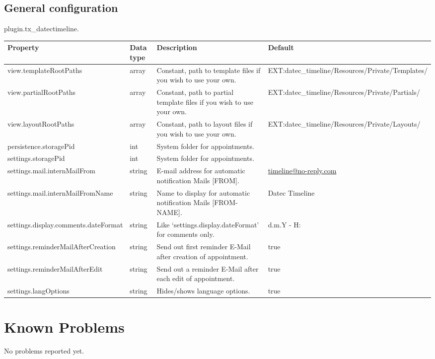\documentclass[a4paper,10pt,english]{sphinxmanual}
\begin{document}
\section{General configuration}
\label{Configuration/Index:general-configuration}
plugin.tx\_datectimeline.

\begin{tabulary}{\linewidth}{|L|L|L|L|}
\hline
\textsf{\relax 
Property
} & \textsf{\relax 
Data type
} & \textsf{\relax 
Description
} & \textsf{\relax 
Default
}\\
\hline
view.templateRootPaths
 & 
array
 & 
Constant, path to template files if you wish to use your own.
 & 
EXT:datec\_timeline/Resources/Private/Templates/
\\
\hline
view.partialRootPaths
 & 
array
 & 
Constant, path to partial template files if you wish to use your own.
 & 
EXT:datec\_timeline/Resources/Private/Partials/
\\
\hline
view.layoutRootPaths
 & 
array
 & 
Constant, path to layout files if you wish to use your own.
 & 
EXT:datec\_timeline/Resources/Private/Layouts/
\\
\hline
persistence.storagePid
 & 
int
 & 
System folder for appointments.
 & \\
\hline
settings.storagePid
 & 
int
 & 
System folder for appointments.
 & \\
\hline
settings.mail.internMailFrom
 & 
string
 & 
E-mail address for automatic notification Mails {[}FROM{]}.
 & 
\href{mailto:timeline@no-reply.com}{timeline@no-reply.com}
\\
\hline
settings.mail.internMailFromName
 & 
string
 & 
Name to display for automatic notification Mails {[}FROM-NAME{]}.
 & 
Datec Timeline
\\
\hline
settings.display.comments.dateFormat
 & 
string
 & 
Like `settings.display.dateFormat' for comments only.
 & 
d.m.Y - H:
\\
\hline
settings.reminderMailAfterCreation
 & 
string
 & 
Send out first reminder E-Mail after creation of appointment.
 & 
true
\\
\hline
settings.reminderMailAfterEdit
 & 
string
 & 
Send out a reminder E-Mail after each edit of appointment.
 & 
true
\\
\hline
settings.langOptions
 & 
string
 & 
Hides/shows language options.
 & 
true
\\
\hline\end{tabulary}



\chapter{Known Problems}
\label{KnownProblems/Index:id1}\label{KnownProblems/Index:known-problems}\label{KnownProblems/Index::doc}
No problems reported yet.
\end{document}
